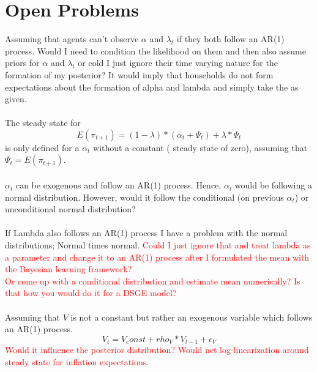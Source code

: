\documentclass[review]{elsarticle}
\begin{document}
\section{Open Problems}
\newpage
\newpage 
Assuming that agents can't observe $\alpha$ and $\lambda_t$ if they both follow an AR(1) process. Would I need to condition the likelihood on them and then also assume priors for $\alpha$ and $\lambda_t$ or cold I just ignore their time varying nature for the formation of my posterior? It would imply that households do not form expectations about the formation of alpha and lambda and simply take the as given.
\\
\\
The steady state for 
\begin{equation*}
E(\pi_{t+1}) = (1-\lambda)*(\alpha_t + \Psi_t) + \lambda*\Psi_t
\end{equation*}
is only defined for a $\alpha_t$ without a constant ( steady state of zero), assuming that $\Psi_t = E(\pi_{t+1}) $.
\\
\\
$\alpha_t$ can be exogenous and follow an AR(1) process. Hence, $\alpha_t$ would be following a normal distribution. However, would it follow the conditional (on previous $\alpha_t$) or unconditional normal distribution?
\\
\\
If Lambda also follows an AR(1) process I have a problem with the normal distributions; Normal times normal. \textcolor{red}{Could I just ignore that and treat lambda as a parameter and change it to an AR(1) process after I formulated the mean with the Bayesian learning framework?}
\\
\textcolor{red}{Or come up with a conditional distribution and estimate mean numerically? Is that how you would do it for a DSGE model?} 
\\
\\ 
Assuming that $V$ is not a constant but rather an exogenous variable which follows an AR(1) process.
\begin{equation}
V_t = V_const + rho_V*V_{t-1} + \epsilon_V 
\end{equation}
\textcolor{red}{Would it influence the posterior distribution? Would net log-linearization around steady state for inflation expectations.}
\end{document}
